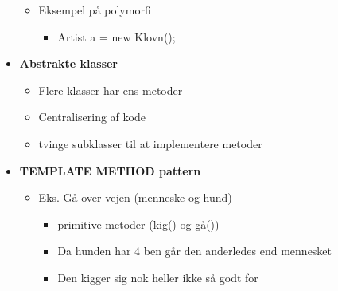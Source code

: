 \begin{itemize}
\begin{itemize}
        \item Eksempel på polymorfi
        \begin{itemize}
            \item Artist a = new Klovn();
        \end{itemize}
    \end{itemize}

    \item \textbf{Abstrakte klasser}
    \begin{itemize}
        \item Flere klasser har ens metoder
        \item Centralisering af kode
        \item tvinge subklasser til at implementere metoder
    \end{itemize}
    
    \item \textbf{TEMPLATE METHOD pattern}
    \begin{itemize}
        \item Eks. Gå over vejen (menneske og hund)
        \begin{itemize}
            \item primitive metoder (kig() og gå())
            \item Da hunden har 4 ben går den anderledes end mennesket
            \item Den kigger sig nok heller ikke så godt for
        \end{itemize}
    \end{itemize}
\end{itemize}

